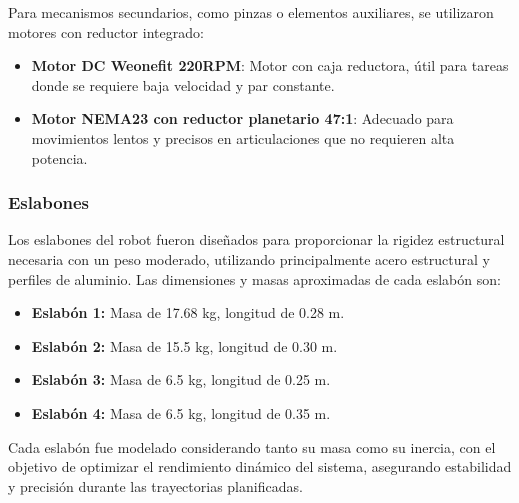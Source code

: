 Para mecanismos secundarios, como pinzas o elementos auxiliares, se utilizaron motores con reductor integrado:

\begin{itemize}
	\item \textbf{Motor DC Weonefit 220RPM}: Motor con caja reductora, útil para tareas donde se requiere baja velocidad y par constante.
	\item \textbf{Motor NEMA23 con reductor planetario 47:1}: Adecuado para movimientos lentos y precisos en articulaciones que no requieren alta potencia.
\end{itemize}

\subsubsection{Eslabones} \label{subsubsec:eslabones}

Los eslabones del robot fueron diseñados para proporcionar la rigidez estructural necesaria con un peso moderado, utilizando principalmente acero estructural y perfiles de aluminio. Las dimensiones y masas aproximadas de cada eslabón son:

\begin{itemize}
	\item \textbf{Eslabón 1:} Masa de 17.68 kg, longitud de 0.28 m.
	\item \textbf{Eslabón 2:} Masa de 15.5 kg, longitud de 0.30 m.
	\item \textbf{Eslabón 3:} Masa de 6.5 kg, longitud de 0.25 m.
	\item \textbf{Eslabón 4:} Masa de 6.5 kg, longitud de 0.35 m.
\end{itemize}

Cada eslabón fue modelado considerando tanto su masa como su inercia, con el objetivo de optimizar el rendimiento dinámico del sistema, asegurando estabilidad y precisión durante las trayectorias planificadas.